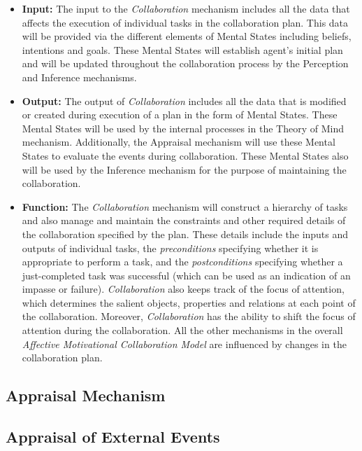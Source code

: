 \documentclass[letterpaper]{article}
\begin{document}
\begin{itemize}
  \item \textbf{Input:} The input to the \textit{Collaboration} mechanism
  includes all the data that affects the execution of individual tasks in the
  collaboration plan. This data will be provided via the different elements of
  Mental States including beliefs, intentions and goals. These Mental States
  will establish agent's initial plan and will be updated throughout the
  collaboration process by the Perception and Inference mechanisms.
  
  \item \textbf{Output:} The output of \textit{Collaboration} includes all the
  data that is modified or created during execution of a plan in the form of
  Mental States. These Mental States will be used by the internal processes in
  the Theory of Mind mechanism. Additionally, the Appraisal mechanism will use
  these Mental States to evaluate the events during collaboration. These Mental
  States also will be used by the Inference mechanism for the purpose of
  maintaining the collaboration.
  
  \item \textbf{Function:} The \textit{Collaboration} mechanism will construct a
  hierarchy of tasks and also manage and maintain the constraints and other
  required details of the collaboration specified by the plan. These details
  include the inputs and outputs of individual tasks, the \textit{preconditions}
  specifying whether it is appropriate to perform a task, and the
  \textit{postconditions} specifying whether a just-completed task was
  successful (which can be used as an indication of an impasse or failure).
  \textit{Collaboration} also keeps track of the focus of attention, which
  determines the salient objects, properties and relations at each point of the
  collaboration. Moreover, \textit{Collaboration} has the ability to shift the
  focus of attention during the collaboration. All the other mechanisms in the
  overall \textit{Affective Motivational Collaboration Model} are influenced by
  changes in the collaboration plan.
\end{itemize}

\subsection{Appraisal Mechanism}

\subsection{Appraisal of External Events}
\end{document}
